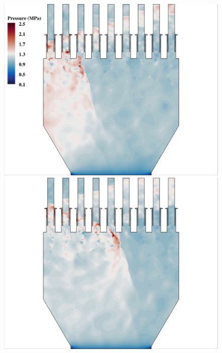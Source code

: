 \begin{figure}
	\begin{minipage}{0.49\linewidth}
		\includegraphics[width=0.99\linewidth,trim={0.5em 0em 6cm 0em},clip]{Chapters/HPROMResults/Images/nineElem/example_snaps/example_pressure_z.png}
	\end{minipage}
	\begin{minipage}{0.49\linewidth}
		\includegraphics[width=0.99\linewidth,trim={6cm 0em 0.5em 0em},clip]{Chapters/HPROMResults/Images/nineElem/example_snaps/example_pressure_z_217000.png}
	\end{minipage}


\end{figure}
